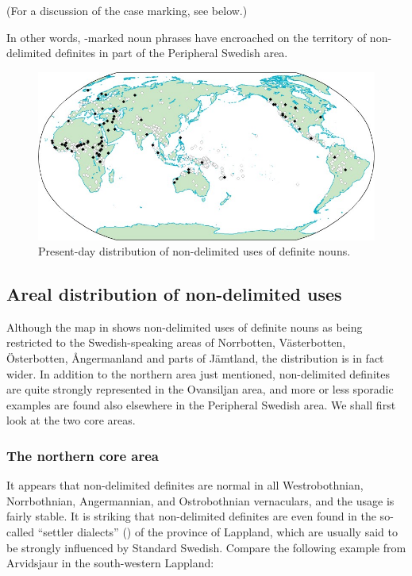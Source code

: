 \z

(For a discussion of the case marking, see  below.) 

In other words, -marked noun phrases have encroached on the territory of non-delimited definites in part of the Peripheral Swedish area. 

\begin{figure}[h]
\includegraphics{figures_mod/image11}
\caption{Present-day distribution of non-delimited uses of definite nouns.}
\label{map:11}

\end{figure}

\subsection{ Areal distribution of non-delimited uses}

Although the map in \citet{Delsing2003a} shows non-delimited uses of definite nouns as being restricted to the Swedish-speaking areas of Norrbotten, Västerbotten, Österbotten, Ångermanland and parts of Jämtland, the distribution is in fact wider. In addition to the northern area just mentioned, non-delimited definites are quite strongly represented in the Ovansiljan area, and more or less sporadic examples are found also elsewhere in the Peripheral Swedish area. We shall first look at the two core areas.

\subsubsection{The northern core area}
It appears that non-delimited definites are normal in all Westrobothnian, Norrbothnian, Angermannian, and Ostrobothnian vernaculars, and the usage is fairly stable. It is striking that non-delimited definites are even found in the so-called “settler dialects” () of the province of Lappland, which are usually said to be strongly influenced by Standard Swedish. Compare the following example from Arvidsjaur in the south-western Lappland:


